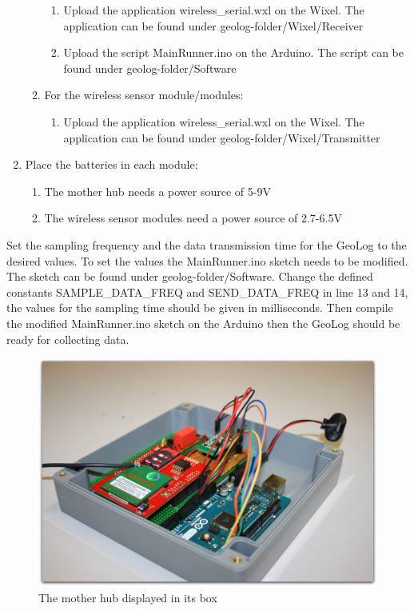 \begin{enumerate}
\begin{enumerate}
\begin{enumerate}
		\item Upload the application wireless\_serial.wxl on the Wixel. The application can be found under geolog-folder/Wixel/Receiver
		\item Upload the script MainRunner.ino on the Arduino. The script can be found under geolog-folder/Software
		\end{enumerate}
	\item For the wireless sensor module/modules:
		\begin{enumerate}
		\item Upload the application wireless\_serial.wxl on the Wixel. The application can be found under geolog-folder/Wixel/Transmitter
		\end{enumerate} 
	\end{enumerate}
\item Place the batteries in each module:
	\begin{enumerate}
	\item The mother hub needs a power source of 5-9V
	\item The wireless sensor modules need a power source of 2.7-6.5V
	\end{enumerate}
\end{enumerate}
Set the sampling frequency and the data transmission time for the GeoLog to the desired values. To set the values the MainRunner.ino sketch needs to be modified. The sketch can be found under geolog-folder/Software. Change the defined constants SAMPLE\_DATA\_FREQ and SEND\_DATA\_FREQ in line 13 and 14, the values for the sampling time should be given in milliseconds. Then compile the modified MainRunner.ino sketch on the Arduino then the GeoLog should be ready for collecting data. %
\begin{figure}[H]
\centering
\includegraphics[width=0.6\linewidth]{graphics/Main_Open.jpg}
\caption{The mother hub displayed in its box\label{fig:Main_Open}}
\end{figure}
